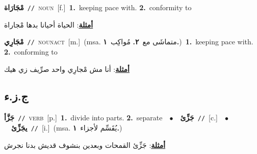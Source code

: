 \documentclass[10pt,a4paper,twoside]{article} %
\begin{document}
\begin{multicols}{2}
{\setlength\topsep{0pt}\textbf{\foreignlanguage{arabic}{مْجَارَاة}}\ {\color{gray}\texttt{//}\color{black}}\ \textsc{noun}\ [f.]\ \textbf{1.}~keeping pace with.  \textbf{2.}~conformity to\  \begin{flushright}\color{gray}\foreignlanguage{arabic}{\textbf{\underline{\foreignlanguage{arabic}{أمثلة}}}: الحياة أحيانا بدها مْجاراة}\end{flushright}\color{black}} \vspace{2mm}

{\setlength\topsep{0pt}\textbf{\foreignlanguage{arabic}{مْجَارِي}}\ {\color{gray}\texttt{//}\color{black}}\ \textsc{noun\textunderscore act}\ [m.]\ \color{gray}(msa. \foreignlanguage{arabic}{متماشَى مع}~\foreignlanguage{arabic}{\textbf{٢.}}  \foreignlanguage{arabic}{مُواكِب}~\foreignlanguage{arabic}{\textbf{١.}})\color{black}\ \textbf{1.}~keeping pace with.  \textbf{2.}~conforming to\  \begin{flushright}\color{gray}\foreignlanguage{arabic}{\textbf{\underline{\foreignlanguage{arabic}{أمثلة}}}: أنا مش مْجارِي واحد صرِّيف زي هيك}\end{flushright}\color{black}} \vspace{2mm}

\vspace{-3mm}
\subsection*{\color{blue}\foreignlanguage{arabic}{ج.ز.ء}\color{blue}{}} 

{\setlength\topsep{0pt}\textbf{\foreignlanguage{arabic}{جَزَّأ}}\ {\color{gray}\texttt{//}\color{black}}\ \textsc{verb}\ [p.]\ \textbf{1.}~divide into parts.  \textbf{2.}~separate\ \ $\bullet$\ \ \setlength\topsep{0pt}\textbf{\foreignlanguage{arabic}{جَزِّئ}}\ {\color{gray}\texttt{//}\color{black}}\ [c.]\ \ $\bullet$\ \ \setlength\topsep{0pt}\textbf{\foreignlanguage{arabic}{يجَزِّئ}}\ {\color{gray}\texttt{//}\color{black}}\ [i.]\ \color{gray}(msa. \foreignlanguage{arabic}{يُقَسِّم لأجزاء}~\foreignlanguage{arabic}{\textbf{١.}})\color{black}\  \begin{flushright}\color{gray}\foreignlanguage{arabic}{\textbf{\underline{\foreignlanguage{arabic}{أمثلة}}}: جَزِّئ القمحات وبعدين بنشوف قديش بدنا نجرش}\end{flushright}\color{black}} \vspace{2mm}


\end{multicols}
\end{document}
